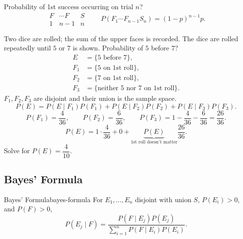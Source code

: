 Probability of 1st success occurring on trial $n$?
\[
  \begin{array}{ccc}
    F & \cdots F & S \\ \hline
    1 & n-1      & n
  \end{array}
  \qquad P(F_1\cdots F_{n-1}S_n)=(1-p)^{n-1}p.
\]

\begin{example}
  Two dice are rolled; the sum of the upper faces is recorded. The dice are rolled repeatedly until $5$ or $7$ is shown. Probability of $5$ before $7$?
  \begin{align*}
    E   & =\{5\text{ before }7\},                                \\
    F_1 & =\{5\text{ on 1st roll}\},                             \\
    F_2 & =\{7\text{ on 1st roll}\},                             \\
    F_3 & =\{\text{neither }5\text{ nor }7\text{ on 1st roll}\}.
  \end{align*}
  $F_1,F_2,F_3$ are disjoint and their union is the sample space.
  \[
    P(E)=P(E\mid F_1)P(F_1)+P(E\mid F_2)P(F_2)+P(E\mid F_3)P(F_3).
  \]
  \[
    P(F_1)=\frac4{36},\qquad P(F_2)=\frac6{36},\qquad
    P(F_3)=1-\frac4{36}-\frac6{36}=\frac{26}{36}.
  \]
  \[
    P(E)=1\cdot\frac4{36}+0+
    \underbrace{P(E)}_{\text{1st roll doesn't matter}}\frac{26}{36}.
  \]
  Solve for $P(E)=\dfrac4{10}$.
\end{example}

\subsection{Bayes' Formula}

\begin{theorem}{Bayes' Formula}{bayes-formula}
  For $E_1,\ldots,E_n$ disjoint with union $S$, $P(E_i)>0$, and $P(F)>0$,
  \[
    P(E_j\mid F)=\frac{P(F\mid E_j)P(E_j)}
    {\displaystyle\sum_{i=1}^n P(F\mid E_i)P(E_i)}.
  \]
\end{theorem}
